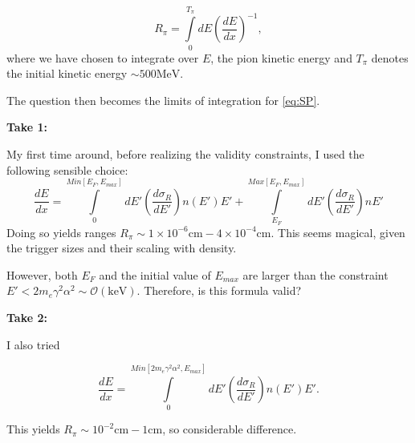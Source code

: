 \documentclass[11 pt, preprint,preprintnumbers,amsmath,amssymb, prd]{revtex4}
\begin{document}
\begin{equation}
R_\pi = \int \limits_{0}^{T_\pi} dE \left(\frac{dE}{dx}\right)^{-1},
\end{equation}
where we have chosen to integrate over $E$, the pion kinetic energy and $T_\pi$ denotes the initial kinetic energy $\sim 500 \text{MeV}$. 

The question then becomes the limits of integration for \ref{eq:SP}. 

\textbf{Take 1:}

My first time around, before realizing the validity constraints, I used the following sensible choice:
\begin{equation}
\frac{dE}{dx} = \int \limits_{0}^{Min[E_F, E_{max}]} dE' \left(\frac{d \sigma_R}{dE'}\right) n(E') E' + \int \limits_{E_F}^{Max[E_F, E_{max}]} dE' \left(\frac{d \sigma_R}{dE'}\right) n E' 
\end{equation}
Doing so yields ranges $R_\pi \sim 1 \times 10^{-6}  \text{cm} - 4 \times 10^{-4} \text{cm}$. This seems magical, given the trigger sizes and their scaling with density. 

However, both $E_F$ and the initial value of $E_{max}$ are larger than the constraint $E' < 2 m_e \gamma^2 \alpha^2 \sim \mathcal{O}(\text{keV})$. Therefore, is this formula valid?

\textbf{Take 2:}

I also tried  

\begin{equation}
\frac{dE}{dx} = \int \limits_{0}^{Min[2 m_e \gamma^2 \alpha^2, E_{max}]} dE' \left(\frac{d \sigma_R}{dE'}\right) n(E') E'. 
\end{equation}

This yields $R_\pi \sim 10^{-2}  \text{cm} - 1 \text{cm}$, so considerable difference. 
\end{document}
